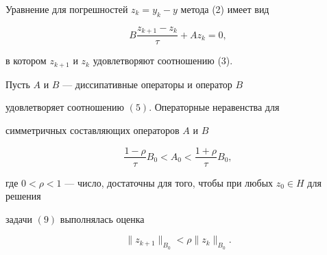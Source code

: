  


Уравнение для погрешностей $z_k=y_k-y$ метода (2) имеет вид 


\begin{equation} 


B\frac{z_{k+1}-z_k}{\tau}+A z_k=0, 


\end{equation} 


в котором $z_{k+1}$ и $z_k$ удовлетворяют соотношению (3). 


 


\begin{lem} 


Пусть $A$ и $B$ --- диссипативные операторы и оператор $B$ 


удовлетворяет соотношению $(5)$. Операторные неравенства для 


симметричных составляющих операторов $A$ и $B$ 


\begin{equation} 


\frac{1-\rho}{\tau}B_0<A_0<\frac{1+\rho}{\tau}B_0, 


\end{equation} 


где $0<\rho<1$ --- число, достаточны для того, чтобы при любых $z_0\in 


H$ для решения 


задачи $(9)$ выполнялась оценка 


\begin{equation} 


\|z_{k+1}\|_{B_0}<\rho\|z_k\|_{B_0}. 


\end{equation} 


\end{lem} 


 


